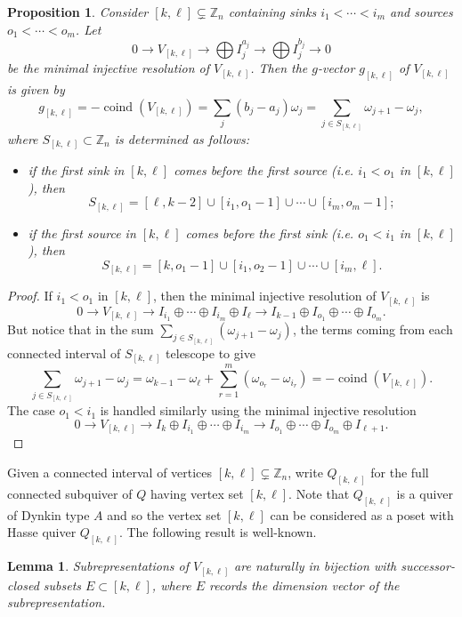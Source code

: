 \documentclass[12pt]{amsart}
\newcommand{\ZZ}{\mathbb{Z}}
\DeclareMathOperator{\coind}{coind}
\newtheorem{lemma}[theorem]{Lemma}
\newtheorem{proposition}[theorem]{Proposition}
\theoremstyle{remark}
\numberwithin{equation}{section}
\begin{document}
\begin{proposition}\label{prop:regular coindices}
  Consider $[k,\ell]\subsetneq\ZZ_n$ containing sinks $i_1 < \cdots < i_m$ and sources $o_1 < \cdots < o_m$.
  Let 
  \[0\to V_{[k,\ell]} \to \bigoplus I_j^{a_j} \to \bigoplus I_j^{b_j}\to 0\]
  be the minimal injective resolution of $V_{[k,\ell]}$.
  Then the $g$-vector $g_{[k,\ell]}$ of $V_{[k,\ell]}$ is given by
  \[g_{[k,\ell]}=-\coind(V_{[k,\ell]})=\sum_j(b_j-a_j)\omega_j=\sum_{j\in S_{[k,\ell]}} \omega_{j+1} - \omega_j,\]
  where $S_{[k,\ell]}\subset\ZZ_n$ is determined as follows:
  \begin{itemize}
    \item if the first sink in $[k,\ell]$ comes before the first source (i.e. $i_1 < o_1$ in $[k,\ell]$), then 
    \[S_{[k,\ell]} = [\ell,k-2] \cup [i_1, o_1 -1] \cup \cdots \cup [i_m, o_m - 1];\]
    \item if the first source in $[k,\ell]$ comes before the first sink (i.e. $o_1 < i_1$ in $[k,\ell]$), then
    \[S_{[k,\ell]} = [k,o_1-1] \cup [i_1,o_2-1] \cup \cdots \cup [i_m,\ell].\]
  \end{itemize}
\end{proposition}
\begin{proof}
  If $i_1 < o_1$ in $[k,\ell]$, then the minimal injective resolution of $V_{[k,\ell]}$ is
  \[0\to V_{[k,\ell]} \to I_{i_1} \oplus \cdots \oplus I_{i_m}\oplus I_\ell \to I_{k-1} \oplus I_{o_1} \oplus \cdots \oplus I_{o_m}.\]
  But notice that in the sum $\sum\limits_{j\in S_{[k,\ell]}} (\omega_{j+1} - \omega_j)$, the terms coming from each connected interval of $S_{[k,\ell]}$ telescope to give
  \[\sum_{j\in S_{[k,\ell]}} \omega_{j+1} - \omega_j=\omega_{k-1}-\omega_\ell+\sum_{r=1}^m (\omega_{o_r}-\omega_{i_r})=-\coind(V_{[k,\ell]}).\]
  The case $o_1<i_1$ is handled similarly using the minimal injective resolution
  \[0\to V_{[k,\ell]} \to I_k\oplus I_{i_1} \oplus \cdots \oplus I_{i_m} \to I_{o_1} \oplus \cdots \oplus I_{o_m}\oplus I_{\ell+1}.\]
\end{proof}

Given a connected interval of vertices $[k,\ell]\subsetneq\ZZ_n$, write $Q_{[k,\ell]}$ for the full connected subquiver of $Q$ having vertex set $[k,\ell]$.  Note that $Q_{[k,\ell]}$ is a quiver of Dynkin type $A$ and so the vertex set $[k,\ell]$ can be considered as a poset with Hasse quiver $Q_{[k,\ell]}$.  The following result is well-known.
\begin{lemma}
  Subrepresentations of $V_{[k,\ell]}$ are naturally in bijection with successor-closed subsets $E\subset[k,\ell]$, where $E$ records the dimension vector of the subrepresentation.
\end{lemma}
\end{document}
